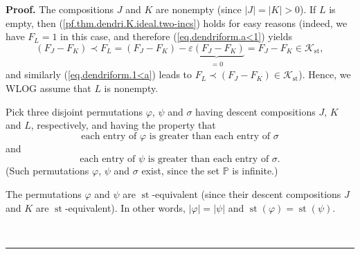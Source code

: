 \documentclass[numbers=enddot,12pt,final,onecolumn,notitlepage]{scrartcl}%
\theoremstyle{definition}
\newenvironment{proof}[1][Proof]{\noindent\textbf{#1.} }{\ \rule{0.5em}{0.5em}}
\newenvironment{verlong}{}{}
\begin{document}
\begin{verlong}
\begin{proof}
The compositions $J$ and $K$ are nonempty (since $\left\vert J\right\vert
=\left\vert K\right\vert >0$). If $L$ is empty, then
(\ref{pf.thm.dendri.K.ideal.two-incs}) holds for easy reasons (indeed, we have
$F_{L}=1$ in this case, and therefore (\ref{eq.dendriform.a<1}) yields
\[
\left(  F_{J}-F_{K}\right)  \left.  \prec\right.  F_{L}=\left(  F_{J}%
-F_{K}\right)  -\underbrace{\varepsilon\left(  F_{J}-F_{K}\right)
}_{\substack{=0}}=F_{J}-F_{K}\in\mathcal{K}_{\operatorname*{st}},
\]
and similarly (\ref{eq.dendriform.1<a}) leads to $F_{L}\left.  \prec\right.
\left(  F_{J}-F_{K}\right)  \in\mathcal{K}_{\operatorname*{st}}$). Hence, we
WLOG assume that $L$ is nonempty.

Pick three disjoint permutations $\varphi$, $\psi$ and $\sigma$ having descent
compositions $J$, $K$ and $L$, respectively, and having the property that%
\[
\text{each entry of }\varphi\text{ is greater than each entry of }\sigma
\]
and%
\[
\text{each entry of }\psi\text{ is greater than each entry of }\sigma\text{.}%
\]
(Such permutations $\varphi$, $\psi$ and $\sigma$ exist, since the set
$\mathbb{P}$ is infinite.)

The permutations $\varphi$ and $\psi$ are $\operatorname*{st}$-equivalent
(since their descent compositions $J$ and $K$ are $\operatorname*{st}%
$-equivalent). In other words, $\left\vert \varphi\right\vert =\left\vert
\psi\right\vert $ and $\operatorname*{st}\left(  \varphi\right)
=\operatorname*{st}\left(  \psi\right)  $.


\end{proof}
\end{verlong}
\end{document}
